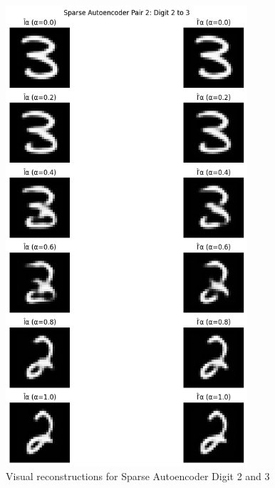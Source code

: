 \documentclass[12pt]{article}
\begin{document}
\begin{figure}
\centering
\includegraphics[width=0.8\textwidth,height=0.8\textheight,keepaspectratio]{Interpolationanalysis_sparse_autoencoder_2.png}
\caption{Visual reconstructions for Sparse Autoencoder Digit 2 and 3}
\end{figure}
\newpage
\end{document}
